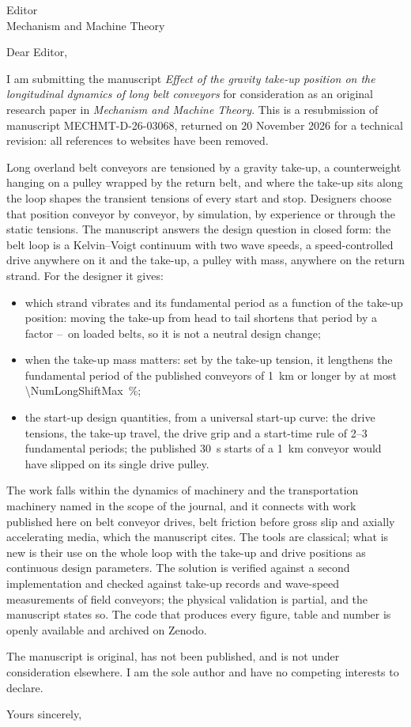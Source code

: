 \documentclass[a4paper,11pt]{letter}
\date{20 November 2026}
\begin{document}
\begin{letter}{Editor\\Mechanism and Machine Theory}
\opening{Dear Editor,}

I am submitting the manuscript \emph{Effect of the gravity take-up position on the longitudinal
dynamics of long belt conveyors} for consideration as an original research paper in
\emph{Mechanism and Machine Theory}. This is a resubmission of manuscript MECHMT-D-26-03068,
returned on 20 November 2026 for a technical revision: all references to websites have been
removed.

Long overland belt conveyors are tensioned by a gravity take-up, a counterweight hanging on a
pulley wrapped by the return belt, and where the take-up sits along the loop shapes the
transient tensions of every start and stop. Designers choose that position conveyor by conveyor,
by simulation, by experience or through the static tensions. The manuscript answers the design
question in closed form: the belt loop is a Kelvin--Voigt continuum with two wave speeds, a
speed-controlled drive anywhere on it and the take-up, a pulley with mass, anywhere on the
return strand. For the designer it gives:
\begin{itemize}\setlength{\itemsep}{1pt}
  \item which strand vibrates and its fundamental period as a function of the take-up position:
        moving the take-up from head to tail shortens that period by a factor
        \NumHeadTailRatioGammaThree--\NumHeadTailRatioGammaOneFive\ on loaded belts, so it is
        not a neutral design change;
  \item when the take-up mass matters: set by the take-up tension, it lengthens the fundamental
        period of the published conveyors of \qty{1}{\kilo\metre} or longer by at most
        \qty{\NumLongShiftMax}{\percent};
  \item the start-up design quantities, from a universal start-up curve: the drive tensions, the
        take-up travel, the drive grip and a start-time rule of 2--3 fundamental periods; the
        published \qty{30}{\second} starts of a \qty{1}{\kilo\metre} conveyor would have slipped
        on its single drive pulley.
\end{itemize}
The work falls within the dynamics of machinery and the transportation machinery named in the
scope of the journal, and it connects with work published here on belt conveyor drives, belt
friction before gross slip and axially accelerating media, which the manuscript cites. The tools
are classical; what is new is their use on the whole loop with the take-up and drive positions
as continuous design parameters. The solution is verified against a second implementation and
checked against take-up records and wave-speed measurements of field conveyors; the physical
validation is partial, and the manuscript states so. The code that produces every figure, table
and number is openly available and archived on Zenodo.

The manuscript is original, has not been published, and is not under consideration
elsewhere. I am the sole author and have no competing interests to declare.

\closing{Yours sincerely,}
\end{letter}
\end{document}
